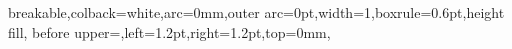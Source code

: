 \documentclass[UTF8,AutoFakeBold,AutoFakeSlant,zihao=-4]{ctexart}
\begin{document}




{
	breakable,colback=white,arc=0mm,outer arc=0pt,width=1\linewidth,boxrule=0.6pt,height fill,
	before upper={\parindent24bp},left=1.2pt,right=1.2pt,top=0mm,
}


\pagestyle{fancy}
\setcounter{page}{1}
\fancyhf{}

\fancyfoot[C]{\fontsize{9pt}{9pt}\selectfont{\thepage}}
\renewcommand{\headrulewidth}{0pt}
\renewcommand{\footrulewidth}{0pt}

\setlength{\parskip}{0em}
\renewcommand{\baselinestretch}{1.53}
\setlength{\parindent}{1.02cm}

\end{document}
